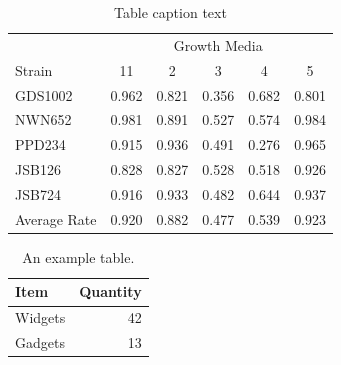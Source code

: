 \documentclass[11pt]{article}
\begin{document}
\begin{table}[ht]
\centering 
\begin{tabular}{l c c c c c} %
& \multicolumn{5}{c}{Growth Media} \\ %
Strain & 11 & 2 & 3 & 4 & 5\\ %
GDS1002 & 0.962 & 0.821 & 0.356 & 0.682 & 0.801\\ %
NWN652 & 0.981 & 0.891 & 0.527 & 0.574 & 0.984\\ %
PPD234 & 0.915 & 0.936 & 0.491 & 0.276 & 0.965\\ %
JSB126 & 0.828 & 0.827 & 0.528 & 0.518 & 0.926\\ %
JSB724 & 0.916 & 0.933 & 0.482 & 0.644 & 0.937\\ %


Average Rate & 0.920 & 0.882 & 0.477 & 0.539 & 0.923\\ %

\end{tabular}
\caption{Table caption text}
\end{table}

\begin{table}
\centering
\begin{tabular}{l|r}
Item & Quantity \\\hline
Widgets & 42 \\
Gadgets & 13
\end{tabular}
\caption{\label{tab:widgets}An example table.}
\end{table}
\end{document}
